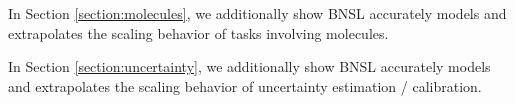 \documentclass{article} %
\begin{document}
In Section \ref{section:molecules}, we additionally show BNSL accurately models and extrapolates the scaling behavior of tasks involving molecules.

\vspace{-2.1mm}

In Section \ref{section:uncertainty}, we additionally show BNSL accurately models and extrapolates the scaling behavior of uncertainty estimation / calibration.

\vspace{-2.0mm}


\iffalse

\FloatBarrier
\end{document}
